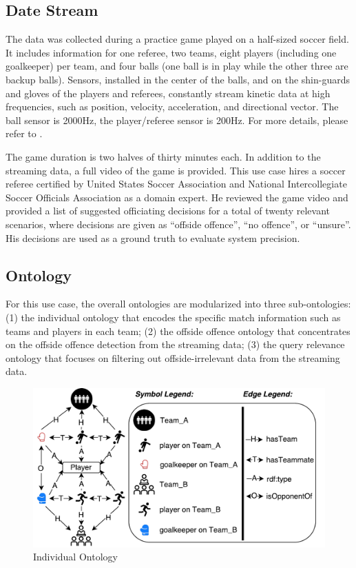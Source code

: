 \subsection{Date Stream}
The data was collected during a practice game played on a half-sized soccer field. 
It includes information for one referee, two teams, eight players (including one goalkeeper) per team, and four balls (one ball is in play while the other three are backup balls). 
Sensors, installed in the center of the balls, and on the shin-guards and gloves of the players and referees, constantly stream kinetic data at high frequencies, such as position, velocity, acceleration, and directional vector. 
The ball sensor is 2000Hz, the player/referee sensor is 200Hz.
For more details, please refer to \cite{mutschler2013debs}.

The game duration is two halves of thirty minutes each.
In addition to the streaming data, a full video of the game is provided. 
This use case hires a soccer referee certified by United States Soccer Association and National Intercollegiate Soccer Officials Association as a domain expert.
He reviewed the game video and provided a list of suggested officiating decisions for a total of twenty relevant scenarios, where decisions are given as ``offside offence'', ``no offence'', or ``unsure''.
His decisions are used as a ground truth to evaluate system precision.
%
\subsection{Ontology}
For this use case, the overall ontologies are modularized into three sub-ontologies:
(1) the individual ontology that encodes the specific match information such as teams and players in each team;
(2) the offside offence ontology that concentrates on the offside offence detection from the streaming data;
(3) the query relevance ontology that focuses on filtering out offside-irrelevant data from the streaming data.

\begin{figure}[!htbp]
	\centering
	\includegraphics[width=5in]{img/5-matchOnto}
	\caption{Individual Ontology}
	\label{fig:matchOnto}
\end{figure}

